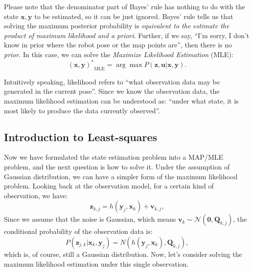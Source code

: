 Please note that the denominator part of Bayes' rule has nothing to do with the state $ \mathbf {x}, \mathbf {y} $ to be estimated, so it can be just ignored. Bayes' rule tells us that solving the maximum posterior probability is \textit {equivalent to the estimate the product of maximum likelihood and a priori}. Further, if we say, ``I'm sorry, I don't know in prior where the robot pose or the map points are'', then there is no \textit {prior}. In this case, we can solve the \textit {Maximize Likelihood Estimation} (MLE):
\begin{equation}
{ (\mathbf{x},\mathbf{y})^*}_{\mathrm{MLE}} = \arg \max P( \mathbf{z},\mathbf{u}| \mathbf{x},\mathbf{y}).
\end{equation}

Intuitively speaking, likelihood refers to ``what observation data may be generated in the current pose''. Since we know the observation data, the maximum likelihood estimation can be understood as: ``under what state, it is most likely to produce the data currently observed''. 

\subsection{Introduction to Least-squares}
Now we have formulated the state estimation problem into a MAP/MLE problem, and the next question is how to solve it. Under the assumption of Gaussian distribution, we can have a simpler form of the maximum likelihood problem. Looking back at the observation model, for a certain kind of observation, we have:
\[
{\mathbf{z}_{k,j}} = h\left( {{ \mathbf{y}_j},{ \mathbf{x}_k}} \right)+ \mathbf{v}_{k, j},
\]
Since we assume that the noise is Gaussian, which means ${\mathbf{v}_k} \sim \mathcal{N}\left( {\mathbf{0},{{{\mathbf{Q}}}_{k,j}}} \right)$, the conditional probability of the observation data is:
\[
P( \mathbf{z}_{j,k} | \mathbf{x}_k, \mathbf{y}_j) = N\left( h(\mathbf{y}_j, \mathbf{x}_k), \mathbf{Q}_{k,j} \right),
\]
which is, of course, still a Gaussian distribution. Now, let's consider solving the maximum likelihood estimation under this single observation.

